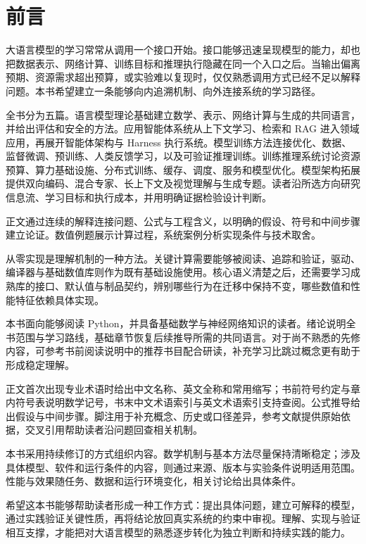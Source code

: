 \chapter*{前言}

大语言模型的学习常常从调用一个接口开始。接口能够迅速呈现模型的能力，却也把数据表示、网络计算、训练目标和推理执行隐藏在同一个入口之后。当输出偏离预期、资源需求超出预算，或实验难以复现时，仅仅熟悉调用方式已经不足以解释问题。本书希望建立一条能够向内追溯机制、向外连接系统的学习路径。

全书分为五篇。语言模型理论基础建立数学、表示、网络计算与生成的共同语言，并给出评估和安全的方法。应用智能体系统从上下文学习、检索和 RAG 进入领域应用，再展开智能体架构与 Harness 执行系统。模型训练方法连接优化、数据、监督微调、预训练、人类反馈学习，以及可验证推理训练。训练推理系统讨论资源预算、算力基础设施、分布式训练、缓存、调度、服务和模型优化。模型架构拓展提供双向编码、混合专家、长上下文及视觉理解与生成专题。读者沿所选方向研究信息流、学习目标和执行成本，并用明确证据检验设计判断。

正文通过连续的解释连接问题、公式与工程含义，以明确的假设、符号和中间步骤建立论证。数值例题展示计算过程，系统案例分析实现条件与技术取舍。

从零实现是理解机制的一种方法。关键计算需要能够被阅读、追踪和验证，驱动、编译器与基础数值库则作为既有基础设施使用。核心语义清楚之后，还需要学习成熟库的接口、默认值与制品契约，辨别哪些行为在迁移中保持不变，哪些数值和性能特征依赖具体实现。

本书面向能够阅读 Python，并具备基础数学与神经网络知识的读者。绪论说明全书范围与学习路线，基础章节恢复后续推导所需的共同语言。对于尚不熟悉的先修内容，可参考书前阅读说明中的推荐书目配合研读，补充学习比跳过概念更有助于形成稳定理解。

正文首次出现专业术语时给出中文名称、英文全称和常用缩写；书前符号约定与章内符号表说明数学记号，书末中文术语索引与英文术语索引支持查阅。公式推导给出假设与中间步骤。脚注用于补充概念、历史或口径差异，参考文献提供原始依据，交叉引用帮助读者沿问题回查相关机制。

本书采用持续修订的方式组织内容。数学机制与基本方法尽量保持清晰稳定；涉及具体模型、软件和运行条件的内容，则通过来源、版本与实验条件说明适用范围。性能与效果随任务、数据和运行环境变化，相关讨论给出具体条件。

希望这本书能够帮助读者形成一种工作方式：提出具体问题，建立可解释的模型，通过实践验证关键性质，再将结论放回真实系统的约束中审视。理解、实现与验证相互支撑，才能把对大语言模型的熟悉逐步转化为独立判断和持续实践的能力。
